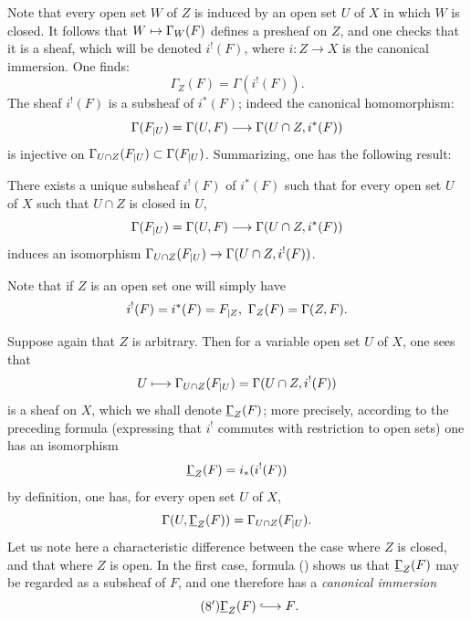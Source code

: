 Note that every open set $W$ of $Z$ is induced by an open set $U$ of
$X$ in which $W$ is closed. It follows that $W \mto \Gamma_W(F)$
defines a presheaf on $Z$, and one checks that it is a sheaf, which
will be denoted $i^!(F)$, where $i\colon Z \to X$ is the canonical
immersion. One finds:
\begin{equation} \label{eq:I.5}
\Gamma_Z(F)=\Gamma(i^!(F)).
\end{equation}
The sheaf $i^!(F)$ is a subsheaf of $i^*(F)$; indeed the canonical
homomorphism:
\[
\Gamma(F\rest{U})=\Gamma(U, F) \to \Gamma(U\cap Z, i^*(F))
\]
is injective on $\Gamma_{U\cap Z}(F_{|U}) \subset \Gamma(F_{|U})$.
Summarizing, one has the following result:

\begin{proposition} \label{I.1.1}
There exists a unique subsheaf $i^!(F)$ of $i^*(F)$ such that for every
open set $U$ of $X$ such that $U\cap Z$ is closed in $U$,
\[
\Gamma(F\rest{U})=\Gamma(U, F) \to \Gamma(U\cap Z, i^*(F))
\]
induces an isomorphism $\Gamma_{U \cap Z}(F\rest{U}) \to \Gamma(U\cap Z, i^!(F))$.
\end{proposition}

Note that if $Z$ is an open set one will simply have
\begin{equation} \label{eq:I.6} {i^!(F)=i^*(F)=F\rest{Z}, \ \Gamma_Z(F)=\Gamma(Z, F)}.
\end{equation}

Suppose again that $Z$ is arbitrary. Then for a variable open set $U$
of $X$, one sees that
\[
U \mto \Gamma_{U\cap Z}(F\rest{U})=\Gamma(U\cap Z, i^!(F))
\]
is a sheaf on $X$, which we shall denote $\underline{\Gamma}_Z(F)$; more
precisely, according to the preceding formula (expressing that $i^!$
commutes with restriction to open sets) one has an isomorphism
\begin{equation} \label{eq:I.7} {\underline{\Gamma}_Z(F)= i_*(i^!(F))}
\end{equation}
by definition, one has, for every open set $U$ of $X$,
\begin{equation} \label{eq:I.8} {\Gamma(U, \underline{\Gamma}_Z(F)) = \Gamma_{U\cap Z}(F_{|U})}.
\end{equation}
Let us note here a characteristic difference between the case where
$Z$ is closed, and that where $Z$ is open. In the first case, formula
() shows us that $\underline{\Gamma}_Z(F)$ may be regarded as a
subsheaf of $F$, and one therefore has a \textit{canonical immersion}
\begin{equation*} \label{eq:I.8'} \tag{$8'$} {\sheaf{\Gamma}_Z(F) \hto F}.
\end{equation*}

